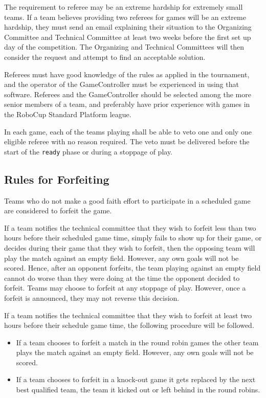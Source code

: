 The requirement to referee may be an extreme hardship for extremely small teams.
If a team believes providing two referees for games will be an extreme hardship, they must send an email explaining their situation to the Organizing Committee and Technical Committee at least two weeks before the first set up day of the competition.
The Organizing and Technical Committees will then consider the request and attempt to find an acceptable solution.

Referees must have good knowledge of the rules as applied in the tournament, and the operator of the GameController must be experienced in using that software.
Referees and the GameController should be selected among the more senior members of a team, and preferably have prior experience with games in the RoboCup Standard Platform league.

In each game, each of the teams playing shall be able to veto one and only one eligible referee with no reason required.
The veto must be delivered before the start of the \texttt{ready} phase or during a stoppage of play.

\subsection{Rules for Forfeiting}
\label{sec:forfeit}

Teams who do not make a good faith effort to participate in a scheduled game are considered to forfeit the game.

If a team notifies the technical committee that they wish to forfeit less than two hours before their scheduled game time, simply fails to show up for their game, or decides during their game that they wish to forfeit, then the opposing team will play the match against an empty field.
However, any own goals will not be scored.
Hence, after an opponent forfeits, the team playing against an empty field cannot do worse than they were doing at the time the opponent decided to forfeit.
Teams may choose to forfeit at any stoppage of play.
However, once a forfeit is announced, they may not reverse this decision.

If a team notifies the technical committee that they wish to forfeit at least two hours before their schedule game time, the following procedure will be followed.
\begin{itemize}
  \item If a team chooses to forfeit a match in the round robin games the other team plays the match against an empty field.
    However, any own goals will not be scored.
  \item If a team chooses to forfeit in a knock-out game it gets replaced by the next best qualified team, \ie the team it kicked out or left behind in the round robins.
\end{itemize}

